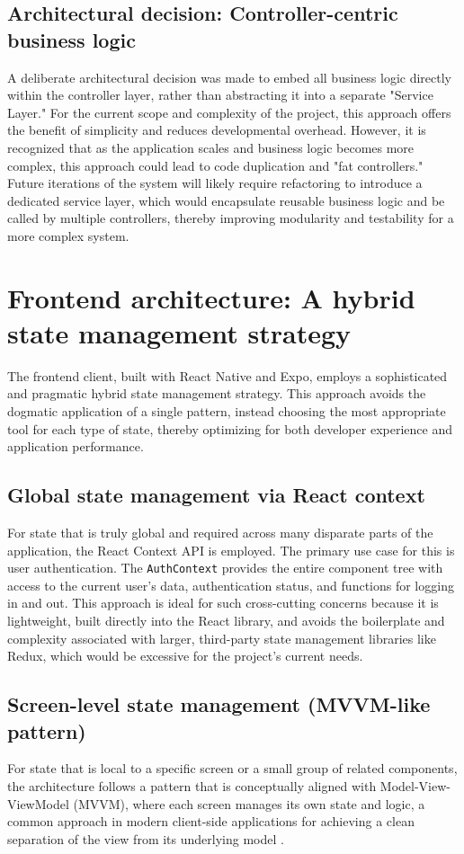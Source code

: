 \subsection{Architectural decision: Controller-centric business logic}
A deliberate architectural decision was made to embed all business logic directly within the controller layer, rather than abstracting it into a separate "Service Layer." For the current scope and complexity of the project, this approach offers the benefit of simplicity and reduces developmental overhead. However, it is recognized that as the application scales and business logic becomes more complex, this approach could lead to code duplication and "fat controllers." Future iterations of the system will likely require refactoring to introduce a dedicated service layer, which would encapsulate reusable business logic and be called by multiple controllers, thereby improving modularity and testability for a more complex system.

\section{Frontend architecture: A hybrid state management strategy}

The frontend client, built with React Native and Expo, employs a sophisticated and pragmatic hybrid state management strategy. This approach avoids the dogmatic application of a single pattern, instead choosing the most appropriate tool for each type of state, thereby optimizing for both developer experience and application performance.

\subsection{Global state management via React context}
For state that is truly global and required across many disparate parts of the application, the React Context API is employed. The primary use case for this is user authentication. The \texttt{AuthContext} provides the entire component tree with access to the current user's data, authentication status, and functions for logging in and out. This approach is ideal for such cross-cutting concerns because it is lightweight, built directly into the React library, and avoids the boilerplate and complexity associated with larger, third-party state management libraries like Redux, which would be excessive for the project's current needs.

\subsection{Screen-level state management (MVVM-like pattern)}
For state that is local to a specific screen or a small group of related components, the architecture follows a pattern that is conceptually aligned with Model-View-ViewModel (MVVM), where each screen manages its own state and logic, a common approach in modern client-side applications for achieving a clean separation of the view from its underlying model \cite{Garg2013ComparingPatterns}.

